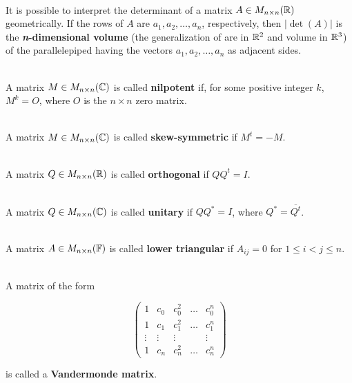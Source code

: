 \begin{definition}
	\hfill\\
	It is possible to interpret the determinant of a matrix $A \in M_{n \times n}(\mathbb{R})$ geometrically. If the rows of $A$ are $a_1, a_2, \dots, a_n$, respectively, then $|\det(A)|$ is the \textbf{\textit{n}-dimensional volume} (the generalization of are in $\mathbb{R}^2$ and volume in $\mathbb{R}^3$) of the parallelepiped having the vectors $a_1, a_2, \dots, a_n$ as adjacent sides.
\end{definition}

\begin{definition}
	\hfill\\
	A matrix $M \in M_{n \times n}(\mathbb{C})$ is called \textbf{nilpotent} if, for some positive integer $k$, $M^k = O$, where $O$ is the $n \times n$ zero matrix.
\end{definition}

\begin{definition}
	\hfill\\
	A matrix $M \in M_{n \times n}(\mathbb{C})$ is called \textbf{skew-symmetric} if $M^t = -M$.
\end{definition}

\begin{definition}
	\hfill\\
	A matrix $Q \in M_{n \times n}(\mathbb{R})$ is called \textbf{orthogonal} if $QQ^t = I$.
\end{definition}

\begin{definition}
	\hfill\\
	A matrix $Q \in M_{n \times n}(\mathbb{C})$ is called \textbf{unitary} if $QQ^* = I$, where $Q^* = \overline{Q^t}$.
\end{definition}

\begin{definition}
	\hfill\\
	A matrix $A \in M_{n \times n}(\mathbb{F})$ is called \textbf{lower triangular} if $A_{ij}=0$ for $1 \leq i < j \leq n$.
\end{definition}

\begin{definition}
	\hfill\\
	A matrix of the form

	\[\begin{pmatrix}
			1      & c_0    & c_0^2  & \dots & c_0^n  \\
			1      & c_1    & c_1^2  & \dots & c_1^n  \\
			\vdots & \vdots & \vdots &       & \vdots \\
			1      & c_n    & c_n^2  & \dots & c_n^n
		\end{pmatrix}\]

	is called a \textbf{Vandermonde matrix}.
\end{definition}

